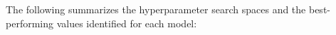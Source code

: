 The following summarizes the hyperparameter search spaces and the best-performing values identified for each model:
